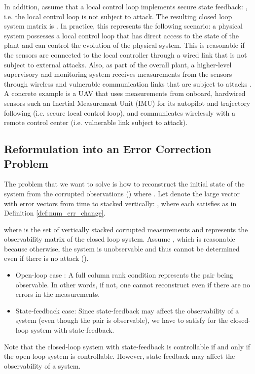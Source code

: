 \documentclass[journal]{IEEEtran}
\begin{document}
In addition, assume that a local control loop implements secure state feedback: , i.e. the local control loop is not subject to attack. The resulting closed loop system matrix is  . 
In practice, this represents the following scenario: a physical system possesses a local control loop that has direct access to the state of the plant and can control the evolution of the physical system. This is reasonable if the sensors are connected to the local controller through a wired link that is not subject to external attacks. Also, as part of the overall plant, a higher-level supervisory and monitoring system receives measurements from the sensors through wireless and vulnerable communication links that are subject to attacks \cite{Fawzi2014}. 
A concrete example is a UAV that uses measurements from onboard, hardwired sensors such an Inertial Measurement Unit (IMU) for its autopilot and trajectory following (i.e. secure local control loop), and communicates wirelessly with a remote control center (i.e. vulnerable link subject to attack).




\subsection{Reformulation into an Error Correction Problem} \label{sec:err_corr}
The problem that we want to solve is how to reconstruct the initial state  of the system from the corrupted observations () where .
Let  denote the large vector with error vectors from time  to  stacked vertically: , where each  satisfies  as in Definition \ref{def:num_err_change}. 

where  is the set of vertically stacked corrupted measurements and  represents the observability matrix of the closed loop system. Assume , which is reasonable because otherwise, the system is unobservable and thus  cannot be determined even if there is no attack ().
\begin{itemize}
\item Open-loop case :  A full column rank condition represents the pair  being observable. In other words, if not, one cannot reconstruct  even if there are no errors in the measurements.
\item State-feedback case: Since state-feedback may affect the observability of a system (even though the pair  is observable), we have to satisfy  for the closed-loop system with state-feedback. \end{itemize}
Note that the closed-loop system with state-feedback is controllable if and only if the open-loop system is controllable. However, state-feedback may affect the observability of a system. 
\end{document}
